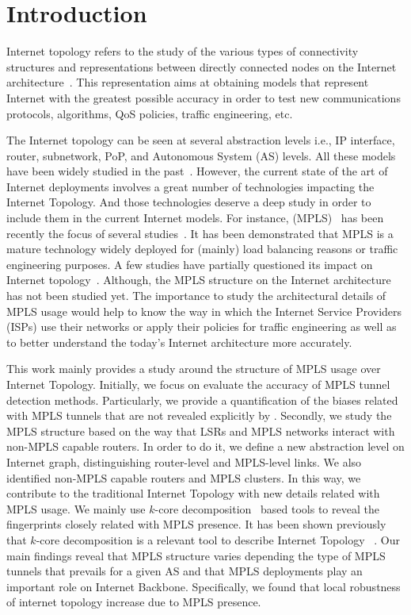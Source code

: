 \section{Introduction}\label{intro}
Internet topology refers to the study of the various types of
connectivity structures and representations between directly connected nodes on
the Internet architecture~\cite{Calvert97}. This representation aims at
obtaining models that represent  Internet with the greatest possible accuracy in order
to test new communications protocols, algorithms, QoS policies, traffic
engineering, etc.

The Internet topology can be seen at several abstraction levels i.e., IP
interface, router, subnetwork, PoP, and Autonomous System (AS) levels. All these
models have been widely studied in the past~\cite{DONNET13}. However, the
current state of the art of Internet deployments involves a great number of
technologies impacting the  Internet Topology.  And those technologies deserve a
deep study in order to include them in the current Internet models.  For instance, 
 (MPLS)~\cite{rfc3031} has been recently the
focus of several studies~\cite{SOM11,Donnet12,Vanaubel15}.  It has been
demonstrated that MPLS is a mature technology widely deployed for (mainly) load
balancing reasons or traffic engineering purposes.  A few studies have
partially questioned its impact on Internet topology~\cite{BRICE07,Flach2012}. 
Although, the MPLS structure on the Internet architecture has not been	
studied yet.  The importance to study  the architectural details of MPLS usage 
would help to know the way in
which the Internet Service Providers (ISPs) use their networks or apply their
policies for traffic engineering as well as to better understand the today's
Internet architecture more accurately. 

This work mainly provides a study around the
structure of MPLS usage over Internet Topology. Initially, we focus on evaluate the
accuracy of MPLS tunnel detection methods. Particularly, we provide a quantification 
of the biases related with MPLS tunnels that are not revealed explicitly by \traceroute.
Secondly, we study the MPLS structure based on the way that LSRs and MPLS networks interact with non-MPLS capable routers. In order to do it, we define a new abstraction level on 
Internet graph, distinguishing  router-level and MPLS-level links. We also
identified non-MPLS capable routers and  MPLS clusters. In this way, we contribute to 
the traditional Internet Topology with new details related with MPLS usage.
We mainly use $k$-core decomposition~\cite{batagelj2002} based tools to reveal the fingerprints
closely related with MPLS presence. It has been shown
previously that $k$-core decomposition is a relevant tool to describe
Internet Topology ~\cite{Alvarez06k, Serrano06, Alvarez08k}. 
Our main findings reveal that MPLS
structure varies depending the type of MPLS tunnels that prevails for a given
AS and that MPLS deployments play an important role on Internet Backbone. Specifically,
we found that local robustness of internet topology increase due to MPLS presence.


